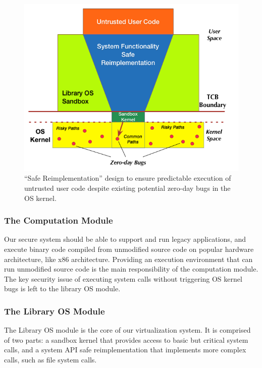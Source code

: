 {\begin{figure}%
\centering
\includegraphics[width=1.0\columnwidth]{diagram/Virtualization_Design_Model_01.png}
\caption{\small ``Safe Reimplementation'' design to ensure predictable execution of untrusted user code
despite existing potential zero-day bugs in the OS kernel.}
\label{fig:design}
\end{figure}


\subsubsection{The Computation Module}

Our secure system should be able to support and run legacy applications,
and execute binary code compiled from unmodified source code on popular hardware architecture,
like x86 architecture. Providing an execution environment that can run unmodified source code is
the main responsibility of the computation module. The key security issue of executing system calls
without triggering OS kernel bugs is left to the library OS module.

\subsubsection{The Library OS Module}

The Library OS module is the core of our virtualization system. It is comprised
of two parts: a sandbox kernel that provides access to basic but critical
system calls, and a system API safe reimplementation that implements more
complex calls, such as file system calls.

}

